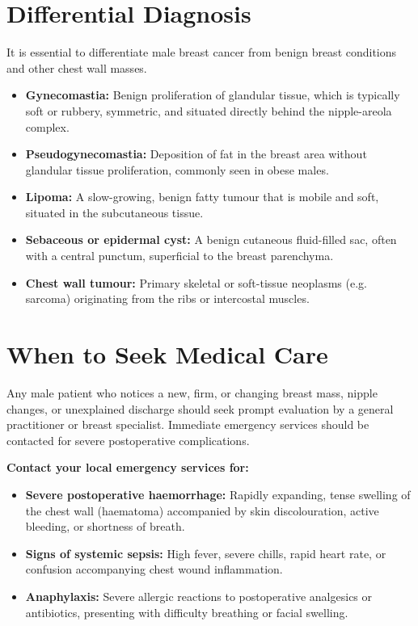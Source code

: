 \section*{Differential Diagnosis}
It is essential to differentiate male breast cancer from benign breast conditions and other chest wall masses.
\begin{itemize}
    \item \textbf{Gynecomastia:} Benign proliferation of glandular tissue, which is typically soft or rubbery, symmetric, and situated directly behind the nipple-areola complex.
    \item \textbf{Pseudogynecomastia:} Deposition of fat in the breast area without glandular tissue proliferation, commonly seen in obese males.
    \item \textbf{Lipoma:} A slow-growing, benign fatty tumour that is mobile and soft, situated in the subcutaneous tissue.
    \item \textbf{Sebaceous or epidermal cyst:} A benign cutaneous fluid-filled sac, often with a central punctum, superficial to the breast parenchyma.
    \item \textbf{Chest wall tumour:} Primary skeletal or soft-tissue neoplasms (e.g. sarcoma) originating from the ribs or intercostal muscles.
\end{itemize}

\section*{When to Seek Medical Care}
Any male patient who notices a new, firm, or changing breast mass, nipple changes, or unexplained discharge should seek prompt evaluation by a general practitioner or breast specialist. Immediate emergency services should be contacted for severe postoperative complications.

\textbf{Contact your local emergency services for:}
\begin{itemize}
    \item \textbf{Severe postoperative haemorrhage:} Rapidly expanding, tense swelling of the chest wall (haematoma) accompanied by skin discolouration, active bleeding, or shortness of breath.
    \item \textbf{Signs of systemic sepsis:} High fever, severe chills, rapid heart rate, or confusion accompanying chest wound inflammation.
    \item \textbf{Anaphylaxis:} Severe allergic reactions to postoperative analgesics or antibiotics, presenting with difficulty breathing or facial swelling.
\end{itemize}

